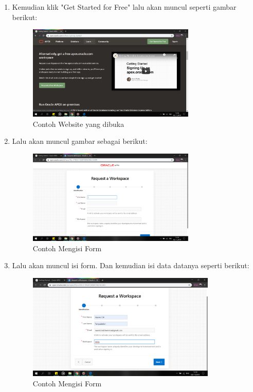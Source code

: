 \begin{enumerate}
\item Kemudian klik "Get Started for Free" lalu akan muncul seperti gambar berikut:
    \begin{figure}[!htbp]
    \centering
    \includegraphics[width=8cm]{picture/04.png}
    \caption{Contoh Website yang dibuka}
    \end{figure}

\item Lalu akan muncul gambar sebagai berikut:
    \begin{figure}[!htbp]
    \centering
    \includegraphics[width=8cm]{picture/05.png}
    \caption{Contoh Mengisi Form}
    \end{figure}
    
\newpage    
\item Lalu akan muncul isi form. Dan kemudian isi data datanya seperti berikut:
    \begin{figure}[!htbp]
    \centering
    \includegraphics[width=9cm]{picture/06.png}
    \caption{Contoh Mengisi Form}
    \end{figure}
    

\end{enumerate}
